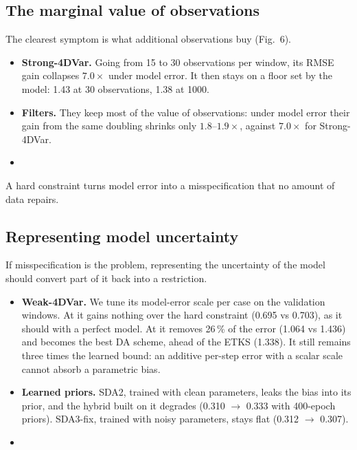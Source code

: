 
\subsection{The marginal value of observations}
The clearest symptom is what additional observations buy (Fig.~6).
\begin{itemize}[leftmargin=*]
  \item \textbf{Strong-4DVar.} Going from 15 to 30 observations per window, its
    RMSE gain collapses $7.0\times$ under model error. It then stays on a floor
    set by the model: 1.43 at 30 observations, 1.38 at 1000.
  \item \textbf{Filters.} They keep most of the value of observations: under
    model error their gain from the same doubling shrinks only $1.8$--$1.9\times$,
    against $7.0\times$ for Strong-4DVar.
  \item {}
\end{itemize}
A hard constraint turns model error into a misspecification that no amount of
data repairs.


\subsection{Representing model uncertainty}
If misspecification is the problem, representing the uncertainty of the model
should convert part of it back into a restriction.
\begin{itemize}[leftmargin=*]
  \item \textbf{Weak-4DVar.} We tune its model-error scale per case on the
    validation windows. At \Sz{} it gains nothing over the hard constraint
    (0.695 vs 0.703), as it should with a perfect model. At \So{} it removes
    26\,\% of the error (1.064 vs 1.436) and becomes the best DA scheme, ahead of
    the ETKS (1.338). It still remains three times the learned bound: an
    additive per-step error with a scalar scale cannot absorb a parametric bias.
  \item \textbf{Learned priors.} SDA2, trained with clean parameters, leaks the
    \So{} bias into its prior, and the hybrid built on it degrades
    (0.310 $\to$ 0.333 with 400-epoch priors). SDA3-fix, trained with noisy
    parameters, stays flat (0.312 $\to$ 0.307).
  \item {}
\end{itemize}


